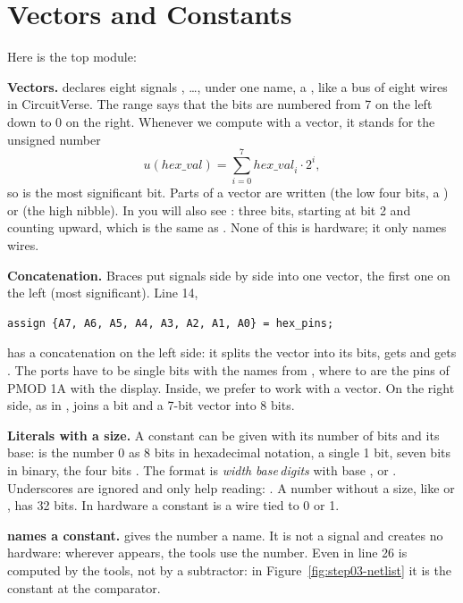 \section{Vectors and Constants}
\label{sec:step03-vectors}

Here is the top module:


\textbf{Vectors.}  declares eight signals
, \dots,  under one name, a , like a
bus of eight wires in CircuitVerse. The range \cc{[7:0]} says that the bits are
numbered from 7 on the left down to 0 on the right. Whenever we compute with
a vector, it stands for the unsigned number
\[
  u(\mathit{hex\_val}) = \sum_{i=0}^{7} \mathit{hex\_val}_i \cdot 2^i ,
\]
so  is the most significant bit. Parts of a vector are written
 (the low four bits, a ) or 
(the high nibble). In  you will also see :
three bits, starting at bit 2 and counting upward, which is the same as
. None of this is hardware; it only names wires.

\textbf{Concatenation.} Braces put signals side by side into one vector, the
first one on the left (most significant). Line 14,
\begin{lstlisting}
assign {A7, A6, A5, A4, A3, A2, A1, A0} = hex_pins;
\end{lstlisting}
has a concatenation on the left side: it splits the vector  into
its bits,  gets  and  gets . The
ports have to be single bits with the names from , where
 to  are the pins of PMOD 1A with the display. Inside, we
prefer to work with a vector. On the right side, as in ,
 joins a bit and a 7-bit vector into 8 bits.

\textbf{Literals with a size.} A constant can be given with its number of bits
and its base:  is the number 0 as 8 bits in hexadecimal notation,
 a single 1 bit,  seven bits in binary,  the
four bits . The format is \emph{width}\,\,\emph{base}\,\emph{digits}
with base ,  or . Underscores are ignored and only help
reading: . A number without a size, like  or , has
32 bits. In hardware a constant is a wire tied to 0 or 1.

\textbf{ names a constant.} 
gives the number a name. It is not a signal and creates no hardware: wherever
 appears, the tools use the number. Even  in
line 26 is computed by the tools, not by a subtractor: in
Figure~\ref{fig:step03-netlist} it is the constant  at the
comparator.

